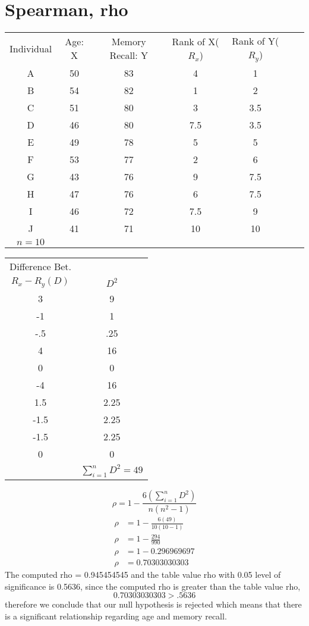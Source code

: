 \documentclass{article}
\begin{document}
    \section*{Spearman, rho}
    \begin{center}
        \begin{tabular}{ccccccc}
            Individual & Age: X & Memory Recall: Y & Rank of X($R_x$)&Rank of Y($R_y$)\\
             A & 50 & 83 &4&1\\ 
             B & 54 & 82 &1&2\\
             C & 51 & 80 &3&3.5\\
             D & 46 & 80 &7.5&3.5\\
             E & 49 & 78 &5&5\\
             F & 53 & 77 &2&6\\
             G & 43 & 76 &9&7.5\\
             H & 47 & 76 &6&7.5\\
             I & 46 & 72 &7.5&9\\
             J & 41 & 71 &10&10\\
             $n=10$
        \end{tabular}
    \end{center}
    \begin{center}
        \begin{tabular}{cc}
            Difference Bet.&\\
            $R_x-R_y(D)$&$D^2$\\
            3&9\\
            -1&1\\
            -.5&.25\\
            4&16\\
            0&0\\
            -4&16\\
            1.5&2.25\\ 
            -1.5&2.25\\
            -1.5&2.25\\
            0&0\\
            &$\sum_{i=1}^{n}D^2=49$
        \end{tabular}
    \end{center}
    \begin{equation}
        \rho=1-\frac{6(\sum_{i=1}^{n}D^2)}{n(n^2-1)}
    \end{equation}
    \begin{align*}
        \rho&=1-\frac{6(49)}{10(10-1)}\\
        \rho&=1-\frac{294}{990}\\
        \rho&=1-0.296969697\\
        \rho&=0.70303030303
    \end{align*}
    The computed rho = 0.945454545 and the table value rho with 0.05 level of significance is
    0.5636,  since the computed rho is greater than the table value rho,
    \begin{equation}
        0.70303030303>.5636
    \end{equation} 
    therefore we conclude that our null hypothesis is rejected which means that there is a significant relationship regarding age and memory recall.
\end{document}
